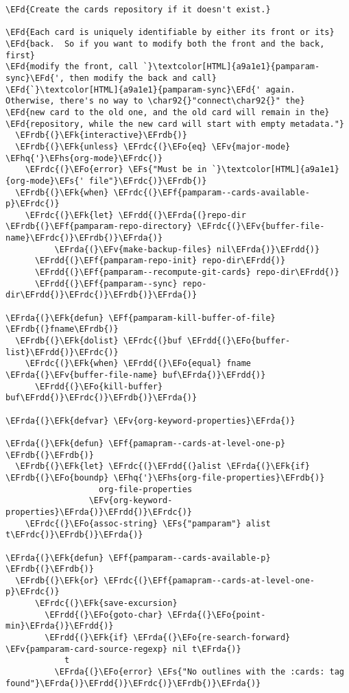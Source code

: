 \documentclass[a4wide,10pt]{article}
\newcommand{\EFs}[1]{\textcolor{EFs}{#1}} %
\newcommand{\EFd}[1]{\textcolor{EFd}{#1}} %
\newcommand{\EFk}[1]{\textcolor{EFk}{#1}} %
\newcommand{\EFf}[1]{\textcolor{EFf}{#1}} %
\newcommand{\EFv}[1]{\textcolor{EFv}{#1}} %
\newcommand{\EFo}[1]{\textcolor{EFo}{#1}} %
\newcommand{\EFhq}[1]{\textcolor{EFhq}{#1}} %
\newcommand{\EFhs}[1]{\textcolor{EFhs}{#1}} %
\newcommand{\EFrda}[1]{\textcolor{EFrda}{#1}} %
\newcommand{\EFrdb}[1]{\textcolor{EFrdb}{#1}} %
\newcommand{\EFrdc}[1]{\textcolor{EFrdc}{#1}} %
\newcommand{\EFrdd}[1]{\textcolor{EFrdd}{#1}} %
\begin{document}
\begin{Code}
\begin{Verbatim}
\EFd{Create the cards repository if it doesn't exist.}

\EFd{Each card is uniquely identifiable by either its front or its}
\EFd{back.  So if you want to modify both the front and the back, first}
\EFd{modify the front, call `}\textcolor[HTML]{a9a1e1}{pamparam-sync}\EFd{', then modify the back and call}
\EFd{`}\textcolor[HTML]{a9a1e1}{pamparam-sync}\EFd{' again.  Otherwise, there's no way to \char92{}"connect\char92{}" the}
\EFd{new card to the old one, and the old card will remain in the}
\EFd{repository, while the new card will start with empty metadata."}
  \EFrdb{(}\EFk{interactive}\EFrdb{)}
  \EFrdb{(}\EFk{unless} \EFrdc{(}\EFo{eq} \EFv{major-mode} \EFhq{'}\EFhs{org-mode}\EFrdc{)}
    \EFrdc{(}\EFo{error} \EFs{"Must be in `}\textcolor[HTML]{a9a1e1}{org-mode}\EFs{' file"}\EFrdc{)}\EFrdb{)}
  \EFrdb{(}\EFk{when} \EFrdc{(}\EFf{pamparam--cards-available-p}\EFrdc{)}
    \EFrdc{(}\EFk{let} \EFrdd{(}\EFrda{(}repo-dir \EFrdb{(}\EFf{pamparam-repo-directory} \EFrdc{(}\EFv{buffer-file-name}\EFrdc{)}\EFrdb{)}\EFrda{)}
          \EFrda{(}\EFv{make-backup-files} nil\EFrda{)}\EFrdd{)}
      \EFrdd{(}\EFf{pamparam-repo-init} repo-dir\EFrdd{)}
      \EFrdd{(}\EFf{pamparam--recompute-git-cards} repo-dir\EFrdd{)}
      \EFrdd{(}\EFf{pamparam--sync} repo-dir\EFrdd{)}\EFrdc{)}\EFrdb{)}\EFrda{)}

\EFrda{(}\EFk{defun} \EFf{pamparam-kill-buffer-of-file} \EFrdb{(}fname\EFrdb{)}
  \EFrdb{(}\EFk{dolist} \EFrdc{(}buf \EFrdd{(}\EFo{buffer-list}\EFrdd{)}\EFrdc{)}
    \EFrdc{(}\EFk{when} \EFrdd{(}\EFo{equal} fname \EFrda{(}\EFv{buffer-file-name} buf\EFrda{)}\EFrdd{)}
      \EFrdd{(}\EFo{kill-buffer} buf\EFrdd{)}\EFrdc{)}\EFrdb{)}\EFrda{)}

\EFrda{(}\EFk{defvar} \EFv{org-keyword-properties}\EFrda{)}

\EFrda{(}\EFk{defun} \EFf{pamapram--cards-at-level-one-p} \EFrdb{(}\EFrdb{)}
  \EFrdb{(}\EFk{let} \EFrdc{(}\EFrdd{(}alist \EFrda{(}\EFk{if} \EFrdb{(}\EFo{boundp} \EFhq{'}\EFhs{org-file-properties}\EFrdb{)}
                   org-file-properties
                 \EFv{org-keyword-properties}\EFrda{)}\EFrdd{)}\EFrdc{)}
    \EFrdc{(}\EFo{assoc-string} \EFs{"pamparam"} alist t\EFrdc{)}\EFrdb{)}\EFrda{)}

\EFrda{(}\EFk{defun} \EFf{pamparam--cards-available-p} \EFrdb{(}\EFrdb{)}
  \EFrdb{(}\EFk{or} \EFrdc{(}\EFf{pamapram--cards-at-level-one-p}\EFrdc{)}
      \EFrdc{(}\EFk{save-excursion}
        \EFrdd{(}\EFo{goto-char} \EFrda{(}\EFo{point-min}\EFrda{)}\EFrdd{)}
        \EFrdd{(}\EFk{if} \EFrda{(}\EFo{re-search-forward} \EFv{pamparam-card-source-regexp} nil t\EFrda{)}
            t
          \EFrda{(}\EFo{error} \EFs{"No outlines with the :cards: tag found"}\EFrda{)}\EFrdd{)}\EFrdc{)}\EFrdb{)}\EFrda{)}


\end{Verbatim}
\end{Code}
\end{document}
